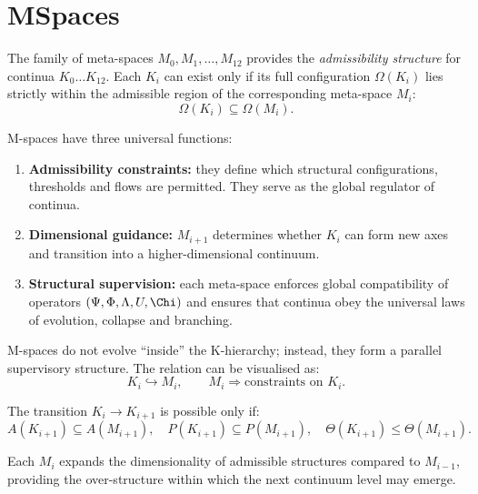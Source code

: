 

\section{MSpaces}
\label{sec:mspaces-overview}

The family of meta-spaces $M_0, M_1, \dots, M_{12}$ provides the
\emph{admissibility structure} for continua $K_0\dots K_{12}$.
Each $K_i$ can exist only if its full configuration
$\Omega(K_i)$ lies strictly within the admissible region of the corresponding
meta-space $M_i$:
\[
\Omega(K_i) \subseteq \Omega(M_i).
\]

M-spaces have three universal functions:

\begin{enumerate}
    \item \textbf{Admissibility constraints:}
    they define which structural configurations, thresholds and flows are permitted.
    They serve as the global regulator of continua.

    \item \textbf{Dimensional guidance:}
    $M_{i+1}$ determines whether $K_i$ can form new axes and transition
    into a higher-dimensional continuum.

    \item \textbf{Structural supervision:}
    each meta-space enforces global compatibility of operators
    $(\Psi,\Phi,\Lambda,U,\Chi)$ and ensures that continua obey the universal
    laws of evolution, collapse and branching.
\end{enumerate}

M-spaces do not evolve “inside” the K-hierarchy; instead,
they form a parallel supervisory structure.
The relation can be visualised as:
\[
K_i \hookrightarrow M_i,\qquad 
M_i \Rightarrow \text{constraints on } K_i.
\]

The transition $K_i \to K_{i+1}$ is possible only if:
\[
A(K_{i+1}) \subseteq A(M_{i+1}), \quad
P(K_{i+1}) \subseteq P(M_{i+1}),\quad
\Theta(K_{i+1}) \leq \Theta(M_{i+1}).
\]

Each $M_i$ expands the dimensionality of admissible structures compared to
$M_{i-1}$, providing the over-structure within which the next continuum level
may emerge.
